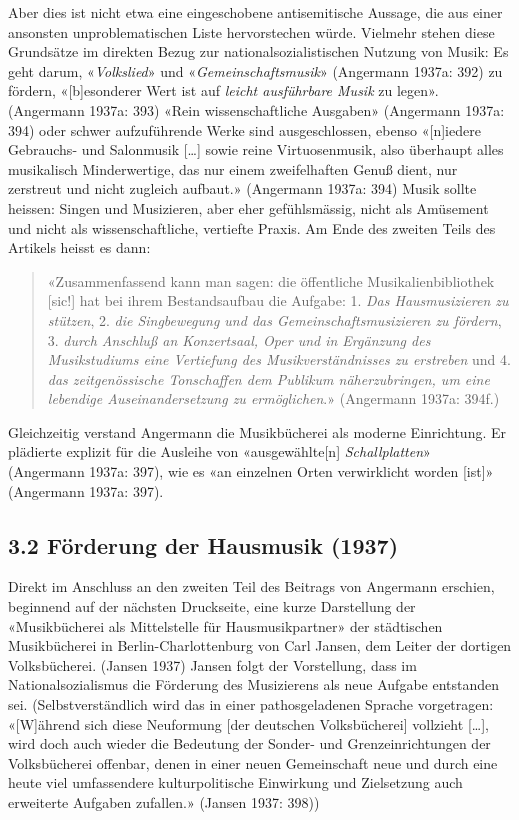 \documentclass[a4paper,
fontsize=11pt,
oneside,
numbers=noperiodatend,
parskip=half-,
bibliography=totoc,
final
]{scrartcl}
\begin{document}
Aber dies ist nicht etwa eine eingeschobene antisemitische Aussage, die
aus einer ansonsten unproblematischen Liste hervorstechen würde.
Vielmehr stehen diese Grundsätze im direkten Bezug zur
nationalsozialistischen Nutzung von Musik: Es geht darum,
«\emph{Volkslied}» und «\emph{Gemeinschaftsmusik}» (Angermann 1937a:
392) zu fördern, «{[}b{]}esonderer Wert ist auf \emph{leicht ausführbare
Musik} zu legen». (Angermann 1937a: 393) «Rein wissenschaftliche
Ausgaben» (Angermann 1937a: 394) oder schwer aufzuführende Werke sind
ausgeschlossen, ebenso «{[}n{]}iedere Gebrauchs- und Salonmusik
{[}\ldots{]} sowie reine Virtuosenmusik, also überhaupt alles
musikalisch Minderwertige, das nur einem zweifelhaften Genuß dient, nur
zerstreut und nicht zugleich aufbaut.» (Angermann 1937a: 394) Musik
sollte heissen: Singen und Musizieren, aber eher gefühlsmässig, nicht
als Amüsement und nicht als wissenschaftliche, vertiefte Praxis. Am Ende
des zweiten Teils des Artikels heisst es dann:

\begin{quote}
«Zusammenfassend kann man sagen: die öffentliche Musikalienbibliothek
{[}sic!{]} hat bei ihrem Bestandsaufbau die Aufgabe: 1. \emph{Das
Hausmusizieren zu stützen}, 2. \emph{die Singbewegung und das
Gemeinschaftsmusizieren zu fördern}, 3. \emph{durch Anschluß an
Konzertsaal, Oper und in Ergänzung des Musikstudiums eine Vertiefung des
Musikverständnisses zu erstreben} und 4. \emph{das zeitgenössische
Tonschaffen dem Publikum näherzubringen, um eine lebendige
Auseinandersetzung zu ermöglichen}.» (Angermann 1937a: 394f.)
\end{quote}

Gleichzeitig verstand Angermann die Musikbücherei als moderne
Einrichtung. Er plädierte explizit für die Ausleihe von
«ausgewählte{[}n{]} \emph{Schallplatten}» (Angermann 1937a: 397), wie es
«an einzelnen Orten verwirklicht worden {[}ist{]}» (Angermann 1937a:
397).

\hypertarget{fuxf6rderung-der-hausmusik-1937}{%
\subsection{3.2 Förderung der Hausmusik
(1937)}\label{fuxf6rderung-der-hausmusik-1937}}

Direkt im Anschluss an den zweiten Teil des Beitrags von Angermann
erschien, beginnend auf der nächsten Druckseite, eine kurze Darstellung
der «Musikbücherei als Mittelstelle für Hausmusikpartner» der
städtischen Musikbücherei in Berlin-Charlottenburg von Carl Jansen, dem
Leiter der dortigen Volksbücherei. (Jansen 1937) Jansen folgt der
Vorstellung, dass im Nationalsozialismus die Förderung des Musizierens
als neue Aufgabe entstanden sei. (Selbstverständlich wird das in einer
pathosgeladenen Sprache vorgetragen: «{[}W{]}ährend sich diese
Neuformung {[}der deutschen Volksbücherei{]} vollzieht {[}\ldots{]},
wird doch auch wieder die Bedeutung der Sonder- und Grenzeinrichtungen
der Volksbücherei offenbar, denen in einer neuen Gemeinschaft neue und
durch eine heute viel umfassendere kulturpolitische Einwirkung und
Zielsetzung auch erweiterte Aufgaben zufallen.» (Jansen 1937: 398))
\end{document}
